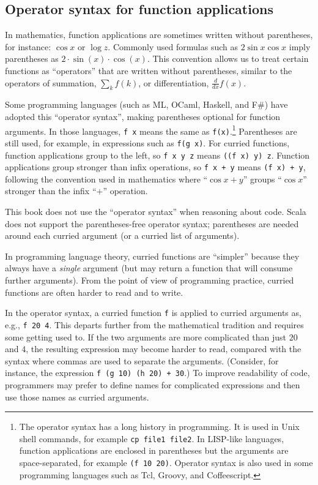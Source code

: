 \subsection{Operator syntax for function applications}

In mathematics, function applications are sometimes written without
parentheses, for instance: $\cos x$ or $\log z$. Commonly used formulas
such as $2\sin x\cos x$ imply parentheses as $2\cdot\sin\left(x\right)\cdot\cos\left(x\right)$.
This convention allows us to treat certain functions as \textsf{``}operators\textsf{''}
that are written without parentheses, similar to the operators of
summation, $\sum_{k}f(k)$, or differentiation, $\frac{d}{dx}f(x)$.

Some programming languages (such as ML, OCaml, Haskell, and F\#) have
adopted this \textsf{``}operator syntax\textsf{''}, making
parentheses optional for function arguments. In those languages, \lstinline!f x!
means the same as \lstinline!f(x)!.\footnote{The operator syntax has a long history in programming. It is used
in Unix shell commands, for example \lstinline!cp file1 file2!. In
LISP-like languages, function applications are enclosed in parentheses
but the arguments are space-separated, for example \lstinline!(f 10 20)!.
Operator syntax is also used in some programming languages such as
Tcl, Groovy, and Coffeescript.} Parentheses are still used, for example, in expressions such as \lstinline!f(g x)!.
For curried functions, function applications group to the left, so
\lstinline!f x y z! means \lstinline!((f x) y) z!. Function applications
group stronger than infix operations, so \lstinline!f x + y! means
\lstinline!(f x) + y!, following the convention used in mathematics
where \textsf{``}$\cos x+y$\textsf{''} groups \textsf{``}$\cos x$\textsf{''} stronger than the infix
\textsf{``}$+$\textsf{''} operation.

This book does not use the \textsf{``}operator syntax\textsf{''} when reasoning about
code. Scala does not support the parentheses-free operator syntax;
parentheses are needed around each curried argument (or a curried
list of arguments).

In programming language theory, curried functions are \textsf{``}simpler\textsf{''}
because they always have a \emph{single} argument (but may return
a function that will consume further arguments). From the point of
view of programming practice, curried functions are often harder to
read and to write.

In the operator syntax, a curried function \lstinline!f! is applied
to curried arguments as, e.g., \lstinline!f 20 4!. This departs further
from the mathematical tradition and requires some getting used to.
If the two arguments are more complicated than just $20$ and $4$,
the resulting expression may become harder to read, compared with
the syntax where commas are used to separate the arguments. (Consider,
for instance, the expression \lstinline!f (g 10) (h 20) + 30!.) To
improve readability of code, programmers may prefer to define names
for complicated expressions and then use those names as curried arguments.

